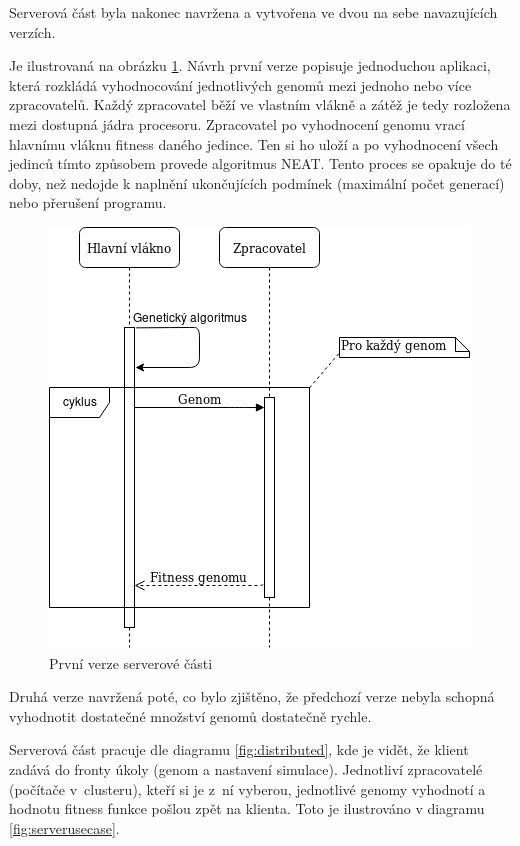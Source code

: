 Serverová část byla nakonec navržena a vytvořena ve dvou na sebe navazujících verzích. 

Je ilustrovaná na obrázku \ref{fig:server_first}. Návrh první verze popisuje jednoduchou aplikaci, která rozkládá vyhodnocování jednotlivých genomů mezi jednoho nebo více zpracovatelů. Každý zpracovatel běží ve vlastním vlákně a zátěž je tedy rozložena mezi dostupná jádra procesoru. Zpracovatel po vyhodnocení genomu vrací hlavnímu vláknu fitness daného jedince. Ten si ho uloží a po vyhodnocení všech jedinců tímto způsobem provede algoritmus NEAT. Tento proces se opakuje do té doby, než nedojde k naplnění ukončujících podmínek (maximální počet generací) nebo přerušení programu.

\begin{figure}[h!]
	\centering
	\includegraphics[width=0.7\linewidth]{server_first_use_case}
	\caption{První verze serverové části}
	\label{fig:server_first}
\end{figure}

Druhá verze navržená poté, co bylo zjištěno, že předchozí verze nebyla schopná vyhodnotit dostatečné množství genomů dostatečně rychle.

Serverová část pracuje dle diagramu \ref{fig:distributed}, kde je vidět, že klient zadává do fronty úkoly (genom a nastavení simulace). Jednotliví zpracovatelé (počítače v~clusteru), kteří si je z~ní vyberou, jednotlivé genomy vyhodnotí a hodnotu fitness funkce pošlou zpět na klienta. Toto je ilustrováno v diagramu \ref{fig:serverusecase}.


